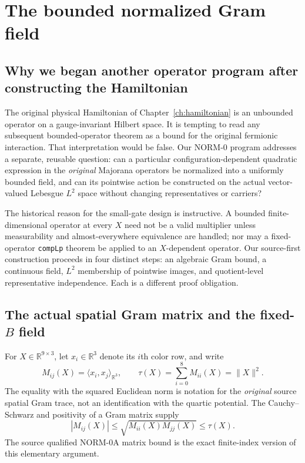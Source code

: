 \section{The bounded normalized Gram field}
\label{ch:norm}

\subsection{Why we began another operator program after constructing the Hamiltonian}
The original physical Hamiltonian of Chapter~\ref{ch:hamiltonian} is an
unbounded operator on a gauge-invariant Hilbert space. It is tempting to
read any subsequent bounded-operator theorem as a bound for the original
fermionic interaction. That interpretation would be false. Our NORM-0
program addresses a separate, reusable question: can a particular
configuration-dependent quadratic expression in the \emph{original}
Majorana operators be normalized into a uniformly bounded field, and can
its pointwise action be constructed on the actual vector-valued Lebesgue
$L^2$ space without changing representatives or carriers?

The historical reason for the small-gate design is instructive. A bounded
finite-dimensional operator at every $X$ need not be a valid multiplier
unless measurability and almost-everywhere equivalence are handled; nor
may a fixed-operator \texttt{compLp} theorem be applied to an
$X$-dependent operator. Our source-first construction proceeds in
four distinct steps: an algebraic Gram bound, a continuous field,
$L^2$ membership of pointwise images, and quotient-level representative
independence. Each is a different proof obligation.

\subsection[The actual spatial Gram matrix and the fixed-B field]{The actual spatial Gram matrix and the fixed-$B$ field}
For $X\in\mathbb R^{9\times3}$, let $x_i\in\mathbb R^3$ denote
its $i$th color row, and write
\begin{equation}\label{eq:norm-gram}
  M_{ij}(X)=\langle x_i,x_j\rangle_{\mathbb R^3},
  \qquad \tau(X)=\sum_{i=0}^{8}M_{ii}(X)=\|X\|^2.
\end{equation}
The equality with the squared Euclidean norm is notation for the
\emph{original} source spatial Gram trace, not an identification with the
quartic potential. The Cauchy--Schwarz and positivity of a Gram matrix
supply
\begin{equation}\label{eq:norm-gram-entry-bound}
   |M_{ij}(X)|\le\sqrt{M_{ii}(X)M_{jj}(X)}\le\tau(X).
\end{equation}
The source qualified NORM-0A matrix bound is the exact finite-index
version of this elementary argument.

